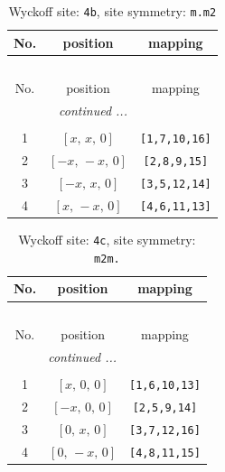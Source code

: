 \documentclass[fleqn,8pt]{jsarticle}
\begin{document}
\begin{longtable}{ccc}
\caption{Wyckoff site: {\tt 4b}, site symmetry: {\tt m.m2}}
 \\
 \hline \hline
No. & position & mapping \\ \hline \endfirsthead

\multicolumn{2}{l}{\tablename\ \thetable{}} \\
 \hline \hline
No. & position & mapping \\ \hline \endhead

 \hline \hline
\multicolumn{2}{r}{\footnotesize\it continued ...} \\ \endfoot

 \hline \hline
\multicolumn{2}{r}{} \\ \endlastfoot

1 & $\left[ x,\, x,\, 0 \right]$ & {\tt [1,7,10,16]} \\ \hline
2 & $\left[ - x,\, - x,\, 0 \right]$ & {\tt [2,8,9,15]} \\ \hline
3 & $\left[ - x,\, x,\, 0 \right]$ & {\tt [3,5,12,14]} \\ \hline
4 & $\left[ x,\, - x,\, 0 \right]$ & {\tt [4,6,11,13]} \\
\end{longtable}
\renewcommand{\arraystretch}{1.2}
\begin{longtable}{ccc}
\caption{Wyckoff site: {\tt 4c}, site symmetry: {\tt m2m.}}
 \\
 \hline \hline
No. & position & mapping \\ \hline \endfirsthead

\multicolumn{2}{l}{\tablename\ \thetable{}} \\
 \hline \hline
No. & position & mapping \\ \hline \endhead

 \hline \hline
\multicolumn{2}{r}{\footnotesize\it continued ...} \\ \endfoot

 \hline \hline
\multicolumn{2}{r}{} \\ \endlastfoot

1 & $\left[ x,\, 0,\, 0 \right]$ & {\tt [1,6,10,13]} \\ \hline
2 & $\left[ - x,\, 0,\, 0 \right]$ & {\tt [2,5,9,14]} \\ \hline
3 & $\left[ 0,\, x,\, 0 \right]$ & {\tt [3,7,12,16]} \\ \hline
4 & $\left[ 0,\, - x,\, 0 \right]$ & {\tt [4,8,11,15]} \\
\end{longtable}
\end{document}

